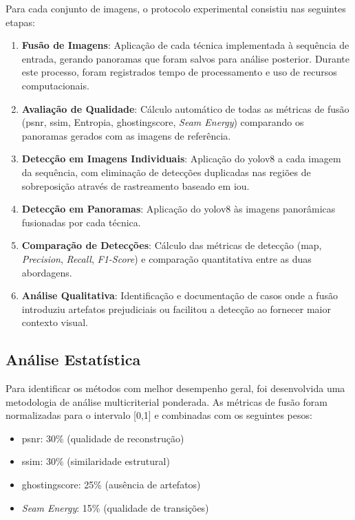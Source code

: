 Para cada conjunto de imagens, o protocolo experimental consistiu nas seguintes etapas:

\begin{enumerate}
    \item \textbf{Fusão de Imagens}: Aplicação de cada técnica implementada à sequência de entrada, gerando panoramas que foram salvos para análise posterior. Durante este processo, foram registrados tempo de processamento e uso de recursos computacionais.
    
    \item \textbf{Avaliação de Qualidade}: Cálculo automático de todas as métricas de fusão (\gls{psnr}, \gls{ssim}, Entropia, \gls{ghostingscore}, \textit{Seam Energy}) comparando os panoramas gerados com as imagens de referência.
    
    \item \textbf{Detecção em Imagens Individuais}: Aplicação do \gls{yolo}v8 a cada imagem da sequência, com eliminação de detecções duplicadas nas regiões de sobreposição através de rastreamento baseado em \gls{iou}.
    
    \item \textbf{Detecção em Panoramas}: Aplicação do \gls{yolo}v8 às imagens panorâmicas fusionadas por cada técnica.
    
    \item \textbf{Comparação de Detecções}: Cálculo das métricas de detecção (\gls{map}, \textit{Precision}, \textit{Recall}, \textit{F1-Score}) e comparação quantitativa entre as duas abordagens.
    
    \item \textbf{Análise Qualitativa}: Identificação e documentação de casos onde a fusão introduziu artefatos prejudiciais ou facilitou a detecção ao fornecer maior contexto visual.
\end{enumerate}

\subsection{Análise Estatística}

Para identificar os métodos com melhor desempenho geral, foi desenvolvida uma metodologia de análise multicriterial ponderada. As métricas de fusão foram normalizadas para o intervalo [0,1] e combinadas com os seguintes pesos:

\begin{itemize}
    \item \gls{psnr}: 30\% (qualidade de reconstrução)
    \item \gls{ssim}: 30\% (similaridade estrutural)
    \item \gls{ghostingscore}: 25\% (ausência de artefatos)
    \item \textit{Seam Energy}: 15\% (qualidade de transições)
\end{itemize}


